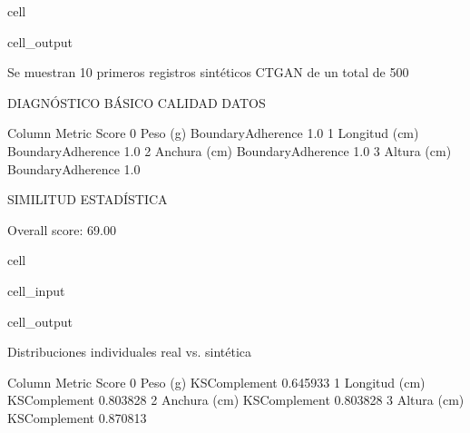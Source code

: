 \documentclass[a4paper,10pt,spanish]{jupyterBook}
\begin{document}
\begin{sphinxuseclass}{cell}
\begin{sphinxVerbatimOutput}
\begin{sphinxuseclass}{cell_output}
\begin{sphinxVerbatim}[commandchars=\\\{\}]
Se muestran 10 primeros registros sintéticos CTGAN de un total de 500

DIAGNÓSTICO BÁSICO CALIDAD DATOS

          Column             Metric  Score
0       Peso (g)  BoundaryAdherence    1.0
1  Longitud (cm)  BoundaryAdherence    1.0
2   Anchura (cm)  BoundaryAdherence    1.0
3    Altura (cm)  BoundaryAdherence    1.0
\end{sphinxVerbatim}

\noindent{}

\begin{sphinxVerbatim}[commandchars=\\\{\}]
SIMILITUD ESTADÍSTICA

Overall score: 69.00\PYGZpc{}
\end{sphinxVerbatim}

\end{sphinxuseclass}\end{sphinxVerbatimOutput}

\end{sphinxuseclass}
\begin{sphinxuseclass}{cell}\begin{sphinxVerbatimInput}

\begin{sphinxuseclass}{cell_input}
\begin{sphinxVerbatim}[commandchars=\\\{\}]
\end{sphinxVerbatim}

\end{sphinxuseclass}\end{sphinxVerbatimInput}
\begin{sphinxVerbatimOutput}

\begin{sphinxuseclass}{cell_output}
\begin{sphinxVerbatim}[commandchars=\\\{\}]
 Distribuciones individuales real vs. sintética

          Column        Metric     Score
0       Peso (g)  KSComplement  0.645933
1  Longitud (cm)  KSComplement  0.803828
2   Anchura (cm)  KSComplement  0.803828
3    Altura (cm)  KSComplement  0.870813
\end{sphinxVerbatim}

\end{sphinxuseclass}\end{sphinxVerbatimOutput}

\end{sphinxuseclass}
\end{document}
